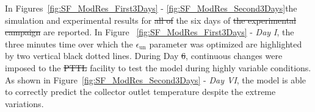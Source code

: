 \documentclass[final,3p,times,review]{elsarticle}
\providecommand{\DIFadd}[1]{{\protect\color{blue}\uwave{#1}}} %
\providecommand{\DIFdel}[1]{{\protect\color{red}\sout{#1}}}                      %
\providecommand{\DIFaddbegin}{} %
\providecommand{\DIFaddend}{} %
\providecommand{\DIFdelbegin}{} %
\providecommand{\DIFdelend}{} %
\begin{document}
In Figures~\ref{fig:SF_ModRes_First3Days} - \ref{fig:SF_ModRes_Second3Days}\DIFaddbegin \DIFadd{,  }\DIFaddend the simulation and experimental results for \DIFdelbegin \DIFdel{all of }\DIFdelend the six days of \DIFdelbegin \DIFdel{the experimental campaign }\DIFdelend \DIFaddbegin \DIFadd{testing }\DIFaddend are reported. In Figure ~\ref{fig:SF_ModRes_First3Days} - \textit{Day I}, the three minutes time over which the $\epsilon_\mathrm{un}$ parameter was optimized are highlighted by two vertical black dotted lines. During Day \DIFdelbegin \DIFdel{6}\DIFdelend \DIFaddbegin \DIFadd{VI}\DIFaddend , continuous changes were imposed to the \DIFdelbegin \DIFdel{PTTL }\DIFdelend \DIFaddbegin \DIFadd{HTF }\DIFaddend facility to test the model during highly variable conditions. As shown in Figure~\ref{fig:SF_ModRes_Second3Days} - \textit{Day VI}, the model is able to correctly predict the collector outlet temperature despite the  extreme variations.
\end{document}
